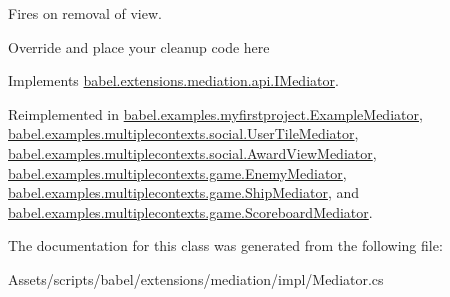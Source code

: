 Fires on removal of view. 

Override and place your cleanup code here 

Implements \hyperlink{interfacebabel_1_1extensions_1_1mediation_1_1api_1_1_i_mediator}{babel.\-extensions.\-mediation.\-api.\-I\-Mediator}.



Reimplemented in \hyperlink{classbabel_1_1examples_1_1myfirstproject_1_1_example_mediator_ac6b3b96cc9b4e5532e7b34ed278eb1ac}{babel.\-examples.\-myfirstproject.\-Example\-Mediator}, \hyperlink{classbabel_1_1examples_1_1multiplecontexts_1_1social_1_1_user_tile_mediator_a31023b75317372308d69e25b2e4ee290}{babel.\-examples.\-multiplecontexts.\-social.\-User\-Tile\-Mediator}, \hyperlink{classbabel_1_1examples_1_1multiplecontexts_1_1social_1_1_award_view_mediator_a7571aa44095d692f2c08f589ec4b8bf4}{babel.\-examples.\-multiplecontexts.\-social.\-Award\-View\-Mediator}, \hyperlink{classbabel_1_1examples_1_1multiplecontexts_1_1game_1_1_enemy_mediator_a2c5abab1d577a583238d326312f78915}{babel.\-examples.\-multiplecontexts.\-game.\-Enemy\-Mediator}, \hyperlink{classbabel_1_1examples_1_1multiplecontexts_1_1game_1_1_ship_mediator_a6f73a1c0f96e9e38d7ea5eaae00622fd}{babel.\-examples.\-multiplecontexts.\-game.\-Ship\-Mediator}, and \hyperlink{classbabel_1_1examples_1_1multiplecontexts_1_1game_1_1_scoreboard_mediator_a42b541ca9978bbd2e921c0db02be1bf5}{babel.\-examples.\-multiplecontexts.\-game.\-Scoreboard\-Mediator}.



The documentation for this class was generated from the following file\-:\begin{DoxyCompactItemize}
\item 
Assets/scripts/babel/extensions/mediation/impl/Mediator.\-cs\end{DoxyCompactItemize}
